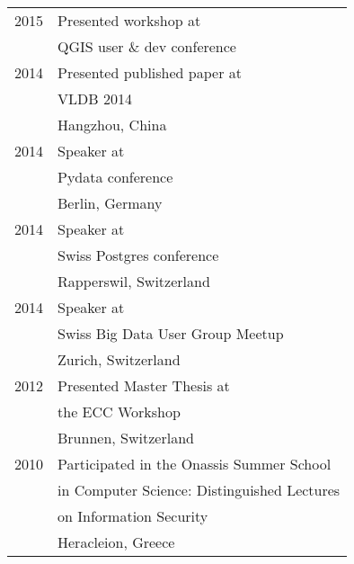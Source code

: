\documentclass[10pt]{article} %
\begin{document}
\begin{minipage}[t]{0.44\textwidth}
\begin{tabular}{rl}
\textsc{2015}
& Presented workshop at \\
& QGIS user \& dev conference \\
\textsc{2014}
& Presented published paper at \\
& VLDB 2014 \\
& \small Hangzhou, China \\
\textsc{2014}
& Speaker at \\
& Pydata conference \\
& \small Berlin, Germany \\
\textsc{2014}
& Speaker at \\
& Swiss Postgres conference \\
& \small Rapperswil, Switzerland \\
\textsc{2014}
& Speaker at \\
& Swiss Big Data User Group Meetup \\
& \small Zurich, Switzerland \\


\textsc{2012}
& Presented Master Thesis at \\
& the ECC Workshop \\
& \small Brunnen, Switzerland \\

\textsc{2010}
& Participated in the Onassis Summer School \\
& in Computer Science: Distinguished Lectures \\
& on Information Security \\
& \small Heracleion, Greece \\




\end{tabular}\\[10pt]


	
\end{minipage} %
\end{document}
